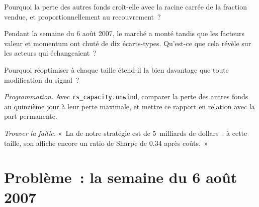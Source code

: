 \begin{exercise}[$\star\star$]\label{exo:rs:capacity-decay-and-crowding:4}
Pourquoi la perte des autres fonds croît-elle avec la racine carrée de la fraction vendue, et proportionnellement au recouvrement~?
\end{exercise}

\begin{exercise}[$\star\star$]\label{exo:rs:capacity-decay-and-crowding:5}
Pendant la semaine du 6 août 2007, le marché a monté tandis que les facteurs valeur et momentum ont chuté de dix écarts-types. Qu'est-ce que cela révèle sur les acteurs qui échangeaient~?
\end{exercise}

\begin{exercise}[$\star\star$]\label{exo:rs:capacity-decay-and-crowding:6}
Pourquoi réoptimiser à chaque taille étend-il la  bien davantage que toute modification du signal~?
\end{exercise}

\begin{exercise}[$\star\star\star$]\label{exo:rs:capacity-decay-and-crowding:7}
\emph{Programmation.} Avec \texttt{rs\_capacity.unwind}, comparer la perte des autres fonds au quinzième jour à leur perte maximale, et mettre ce rapport en relation avec la part permanente.
\end{exercise}

\begin{exercise}[$\star\star\star$]\label{exo:rs:capacity-decay-and-crowding:8}
\emph{Trouver la faille.} «~La  de notre stratégie est de 5~milliards de dollars~: à cette taille, son  affiche encore un ratio de Sharpe de 0.34 après coûts.~»
\end{exercise}

\section{Problème~: la semaine du 6 août 2007}


